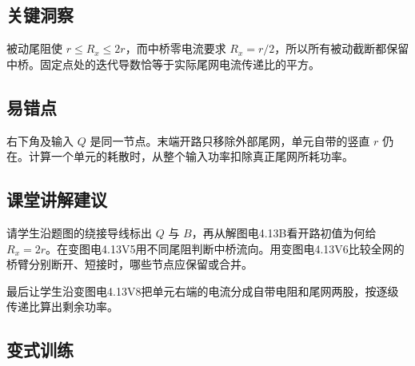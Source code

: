\documentclass[UTF8,fontset=fandol,a4paper,11pt]{ctexart}
\begin{document}


\subsection*{关键洞察}

被动尾阻使 $r\le R_x\le2r$，而中桥零电流要求 $R_x=r/2$，所以所有被动截断都保留中桥。固定点处的迭代导数恰等于实际尾网电流传递比的平方。



\subsection*{易错点}

右下角及输入 $Q$ 是同一节点。末端开路只移除外部尾网，单元自带的竖直 $r$ 仍在。计算一个单元的耗散时，从整个输入功率扣除真正尾网所耗功率。



\subsection*{课堂讲解建议}

请学生沿题图的绕接导线标出 $Q$ 与 $B$，再从解图电4.13B看开路初值为何给 $R_x=2r$。在变图电4.13V5用不同尾阻判断中桥流向。用变图电4.13V6比较全网的桥臂分别断开、短接时，哪些节点应保留或合并。

最后让学生沿变图电4.13V8把单元右端的电流分成自带电阻和尾网两股，按逐级传递比算出剩余功率。


\subsection*{变式训练}
\end{document}
